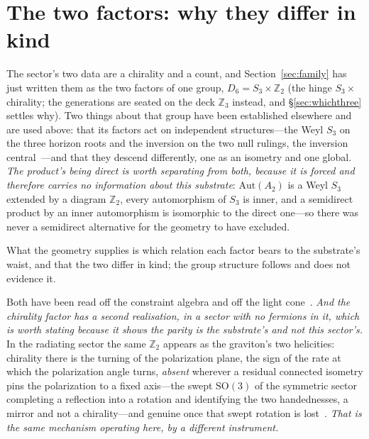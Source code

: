 \documentclass[11pt]{article}
\begin{document}
\section{The two factors: why they differ in kind}\label{sec:twofactors}

The sector's two data are a chirality and a count, and Section~\ref{sec:family} has just written them as the two factors of one group, $D_6=S_3\times\mathbb{Z}_2$ (the hinge $S_3\times$ chirality; the generations are seated on the deck $\mathbb{Z}_3$ instead, and \S\ref{sec:whichthree} settles why). Two things about that group have been established elsewhere and are used above: that its factors act on independent structures---the Weyl $S_3$ on the three horizon roots and the inversion on the two null rulings, the inversion central~\cite{JanzenAlgebroid}---and that they descend differently, one as an isometry and one global. \emph{The product's being direct is worth separating from both, because it is forced and therefore carries no information about this substrate}: $\mathrm{Aut}(A_2)$ is a Weyl $S_3$ extended by a diagram $\mathbb{Z}_2$, every automorphism of $S_3$ is inner, and a semidirect product by an inner automorphism is isomorphic to the direct one---so there was never a semidirect alternative for the geometry to have excluded. 

What the geometry supplies is which relation each factor bears to the substrate's waist, and that the two differ in kind; the group structure follows and does not evidence it. 

Both have been read off the constraint algebra and off the light cone~\cite{JanzenAlgebroid}. \emph{And the chirality factor has a second realisation, in a sector with no fermions in it, which is worth
stating because it shows the parity is the substrate's and not this sector's.} In the radiating sector the same
$\mathbb{Z}_2$ appears as the graviton's two helicities: chirality there is the turning of the polarization
plane, the sign of the rate at which the polarization angle turns, \emph{absent} wherever a residual connected
isometry pins the polarization to a fixed axis---the swept $\mathrm{SO}(3)$ of the symmetric sector completing a
reflection into a rotation and identifying the two handednesses, a mirror and not a chirality---and genuine
once that swept rotation is lost~\cite{JanzenDynamics}. \emph{That is the same mechanism operating here, by a
different instrument.} 
\end{document}
